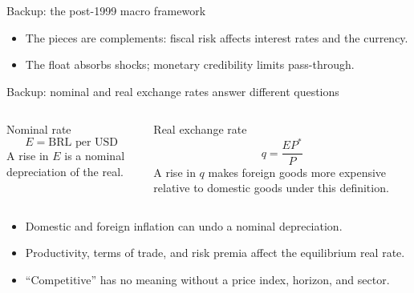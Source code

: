 \documentclass[10pt,aspectratio=169]{beamer}
\begin{document}
\begin{frame}{Backup: the post-1999 macro framework}
  \begin{center}
  \end{center}
  \vspace{.35cm}
  \begin{itemize}
    \item The pieces are complements: fiscal risk affects interest rates and the currency.
    \item The float absorbs shocks; monetary credibility limits pass-through.
  \end{itemize}
\end{frame}

\begin{frame}{Backup: nominal and real exchange rates answer different questions}
  \begin{columns}[T,onlytextwidth]
      \begin{block}{Nominal rate}
        \[
          E=\text{BRL per USD}
        \]
        A rise in $E$ is a nominal depreciation of the real.
      \end{block}
      \begin{exampleblock}{Real exchange rate}
        \[
          q=\frac{E P^{*}}{P}
        \]
        A rise in $q$ makes foreign goods more expensive relative to domestic goods under this definition.
      \end{exampleblock}
  \end{columns}
  \vspace{.4cm}
  \begin{itemize}
    \item Domestic and foreign inflation can undo a nominal depreciation.
    \item Productivity, terms of trade, and risk premia affect the equilibrium real rate.
    \item ``Competitive'' has no meaning without a price index, horizon, and sector.
  \end{itemize}
\end{frame}
\end{document}
